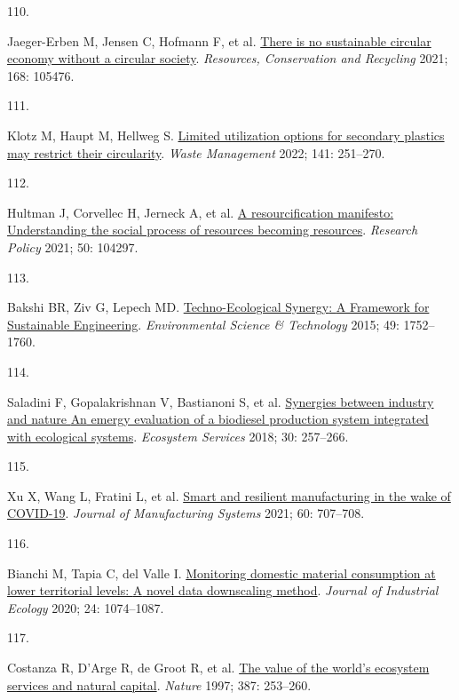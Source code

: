 \documentclass[
  12pt,
  a4paperpaper,
  onecolumn]{article}
\newlength{\cslhangindent}
\newlength{\csllabelwidth}
\newlength{\cslentryspacingunit} %
\newenvironment{CSLReferences}[2] %
 {%
  \setlength{\parindent}{0pt}
  \ifodd #1
  \let\oldpar\par
  \def\par{\hangindent=\cslhangindent\oldpar}
  \fi
  \setlength{\parskip}{#2\cslentryspacingunit}
 }%
 {}
\newcommand{\CSLLeftMargin}[1]{\parbox[t]{\csllabelwidth}{#1}}
\newcommand{\CSLRightInline}[1]{\parbox[t]{\linewidth - \csllabelwidth}{#1}\break}
\begin{document}
\begin{CSLReferences}{0}{0}
\leavevmode{}%
\CSLLeftMargin{110. }%
\CSLRightInline{Jaeger-Erben M, Jensen C, Hofmann F, et al.
\href{https://doi.org/10.1016/j.resconrec.2021.105476}{There is no
sustainable circular economy without a circular society}.
\emph{Resources, Conservation and Recycling} 2021; 168: 105476.}

\leavevmode{}%
\CSLLeftMargin{111. }%
\CSLRightInline{Klotz M, Haupt M, Hellweg S.
\href{https://doi.org/10.1016/J.WASMAN.2022.01.002}{Limited utilization
options for secondary plastics may restrict their circularity}.
\emph{Waste Management} 2022; 141: 251--270.}

\leavevmode{}%
\CSLLeftMargin{112. }%
\CSLRightInline{Hultman J, Corvellec H, Jerneck A, et al.
\href{https://doi.org/10.1016/j.respol.2021.104297}{A resourcification
manifesto: {Understanding} the social process of resources becoming
resources}. \emph{Research Policy} 2021; 50: 104297.}

\leavevmode{}%
\CSLLeftMargin{113. }%
\CSLRightInline{Bakshi BR, Ziv G, Lepech MD.
\href{https://doi.org/10.1021/es5041442}{Techno-{Ecological Synergy}: {A
Framework} for {Sustainable Engineering}}. \emph{Environmental Science
\& Technology} 2015; 49: 1752--1760.}

\leavevmode{}%
\CSLLeftMargin{114. }%
\CSLRightInline{Saladini F, Gopalakrishnan V, Bastianoni S, et al.
\href{https://doi.org/10.1016/j.ecoser.2018.02.004}{Synergies between
industry and nature \textendash{} {An} emergy evaluation of a biodiesel
production system integrated with ecological systems}. \emph{Ecosystem
Services} 2018; 30: 257--266.}

\leavevmode{}%
\CSLLeftMargin{115. }%
\CSLRightInline{Xu X, Wang L, Fratini L, et al.
\href{https://doi.org/10.1016/j.jmsy.2021.07.025}{Smart and resilient
manufacturing in the wake of {COVID-19}}. \emph{Journal of Manufacturing
Systems} 2021; 60: 707--708.}

\leavevmode{}%
\CSLLeftMargin{116. }%
\CSLRightInline{Bianchi M, Tapia C, del Valle I.
\href{https://doi.org/10.1111/jiec.13000}{Monitoring domestic material
consumption at lower territorial levels: {A} novel data downscaling
method}. \emph{Journal of Industrial Ecology} 2020; 24: 1074--1087.}

\leavevmode{}%
\CSLLeftMargin{117. }%
\CSLRightInline{Costanza R, D'Arge R, de Groot R, et al.
\href{https://doi.org/10.1038/387253a0}{The value of the world's
ecosystem services and natural capital}. \emph{Nature} 1997; 387:
253--260.}


\end{CSLReferences}
\end{document}
